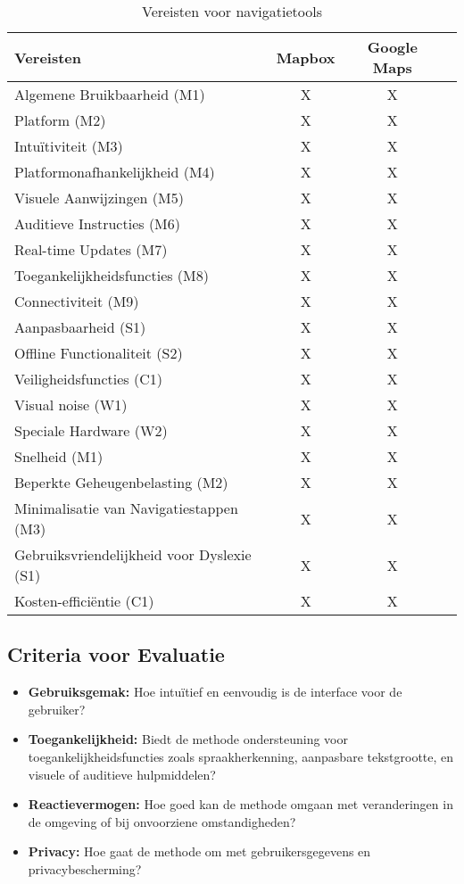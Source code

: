 \begin{table}[ht]
    \centering
    \begin{tabular}{|l|c|c|c|}
        \hline
        \textbf{Vereisten} & \textbf{Mapbox} & \textbf{Google Maps} \\ \hline
        Algemene Bruikbaarheid (M1) & X & X \\
        Platform (M2) & X & X \\
        Intuïtiviteit (M3) & X & X \\
        Platformonafhankelijkheid (M4) & X & X \\
        Visuele Aanwijzingen (M5) & X & X \\
        Auditieve Instructies (M6) & X & X \\
        Real-time Updates (M7) & X & X \\
        Toegankelijkheidsfuncties (M8) & X & X \\
        Connectiviteit (M9) & X & X \\
        Aanpasbaarheid (S1) & X & X \\
        Offline Functionaliteit (S2) & X & X \\
        Veiligheidsfuncties (C1) & X & X \\
        Visual noise (W1) & X & X \\
        Speciale Hardware (W2) & X & X \\
        Snelheid (M1) & X & X \\
        Beperkte Geheugenbelasting (M2) & X & X \\
        Minimalisatie van Navigatiestappen (M3) & X & X \\
        Gebruiksvriendelijkheid voor Dyslexie (S1) & X & X \\
        Kosten-efficiëntie (C1) & X & X \\ \hline
    \end{tabular}
    \caption{Vereisten voor navigatietools}
    \label{tab:vereisten voor navigatietools}
\end{table}

\subsection{Criteria voor Evaluatie}
\begin{itemize}
    \item \textbf{Gebruiksgemak:} Hoe intuïtief en eenvoudig is de interface voor de gebruiker?
    \item \textbf{Toegankelijkheid:} Biedt de methode ondersteuning voor toegankelijkheidsfuncties zoals spraakherkenning, aanpasbare tekstgrootte, en visuele of auditieve hulpmiddelen?
    \item \textbf{Reactievermogen:} Hoe goed kan de methode omgaan met veranderingen in de omgeving of bij onvoorziene omstandigheden?
    \item \textbf{Privacy:} Hoe gaat de methode om met gebruikersgegevens en privacybescherming?
\end{itemize}

